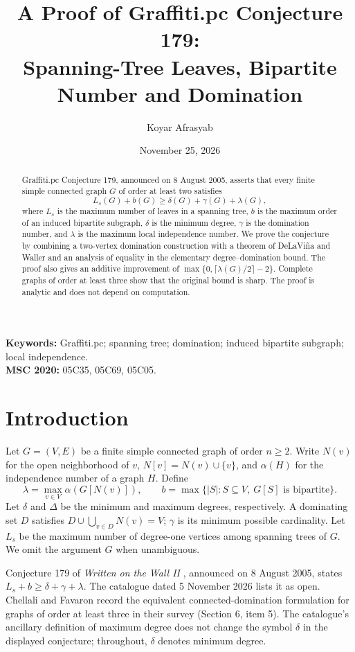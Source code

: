 \documentclass[11pt,a4paper]{article}
\title{A Proof of Graffiti.pc Conjecture 179:\\ Spanning-Tree Leaves, Bipartite Number and Domination}
\author{Koyar Afrasyab}
\date{November 25, 2026}
\newcommand{\ls}{L_s}
\newcommand{\lam}{\lambda}
\begin{document}
\maketitle
\begin{abstract}
Graffiti.pc Conjecture 179, announced on 8 August 2005, asserts that every finite simple connected graph $G$ of order at least two satisfies
\[
\ls(G)+b(G)\ge \delta(G)+\gamma(G)+\lam(G),
\]
where $\ls$ is the maximum number of leaves in a spanning tree, $b$ is the maximum order of an induced bipartite subgraph, $\delta$ is the minimum degree, $\gamma$ is the domination number, and $\lam$ is the maximum local independence number. We prove the conjecture by combining a two-vertex domination construction with a theorem of DeLaVi\~na and Waller and an analysis of equality in the elementary degree--domination bound. The proof also gives an additive improvement of $\max\{0,\lceil\lam(G)/2\rceil-2\}$. Complete graphs of order at least three show that the original bound is sharp. The proof is analytic and does not depend on computation.
\end{abstract}
\noindent\textbf{Keywords:} Graffiti.pc; spanning tree; domination; induced bipartite subgraph; local independence.\\
\textbf{MSC 2020:} 05C35, 05C69, 05C05.
\section{Introduction}
Let $G=(V,E)$ be a finite simple connected graph of order $n\ge2$. Write $N(v)$ for the open neighborhood of $v$, $N[v]=N(v)\cup\{v\}$, and $\alpha(H)$ for the independence number of a graph $H$. Define
\[
\lam=\max_{v\in V}\alpha(G[N(v)]),\qquad
b=\max\{|S|:S\subseteq V,\ G[S]\text{ is bipartite}\}.
\]
Let $\delta$ and $\Delta$ be the minimum and maximum degrees, respectively. A dominating set $D$ satisfies $D\cup\bigcup_{v\in D}N(v)=V$; $\gamma$ is its minimum possible cardinality. Let $\ls$ be the maximum number of degree-one vertices among spanning trees of $G$. We omit the argument $G$ when unambiguous.

Conjecture 179 of \emph{Written on the Wall II} \cite{wow}, announced on 8 August 2005, states $\ls+b\ge\delta+\gamma+\lam$. The catalogue dated 5 November 2026 lists it as open. Chellali and Favaron \cite{cf} record the equivalent connected-domination formulation for graphs of order at least three in their survey (Section 6, item 5). The catalogue's ancillary definition of maximum degree does not change the symbol $\delta$ in the displayed conjecture; throughout, $\delta$ denotes minimum degree.
\end{document}

